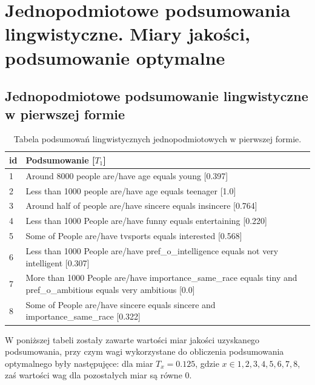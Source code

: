 \documentclass{classrep}
\begin{document}


\section{ Jednopodmiotowe podsumowania lingwistyczne. Miary jakości, podsumowanie optymalne}

\subsection{Jednopodmiotowe podsumowanie lingwistyczne w pierwszej formie}


\begin{center}
  \begin{table}[H]
    \begin{tabularx}{\textwidth}{lXc}
    
    id & Podsumowanie [$T_1$] \\ \hline 
  
    1 & Around 8000 people are/have age equals young [0.397] \\ \hline
    2 & Less than 1000 people are/have age equals teenager [1.0]\\ \hline
    3 & Around half of people are/have sincere equals insincere [0.764] \\ \hline
    4 & Less than 1000 People are/have funny equals entertaining [0.220] \\ \hline
    5 & Some of People are/have tvsports equals interested [0.568] \\ \hline
    6 & Less than 1000 People are/have pref\_o\_intelligence equals not very intelligent [0.307]\\ \hline
    7 & More than 1000 People are/have importance\_same\_race equals tiny and pref\_o\_ambitious equals very ambitious [0.0] \\ \hline 
    8 & Some of People are/have sincere equals sincere and importance\_same\_race [0.322]\\ \hline 

  \end{tabularx}
  \caption{Tabela podsumowań lingwistycznych jednopodmiotowych w pierwszej formie.}
\end{table}
\end{center}


W poniższej tabeli zostały zawarte wartości miar jakości uzyskanego podsumowania, przy czym wagi wykorzystane do
obliczenia podsumowania optymalnego były następujęce: dla miar $T_{x} = 0.125$, gdzie $x \in {1,2,3,4,5,6,7,8}$, zaś wartości wag dla pozostałych miar są równe 0.
\end{document}
